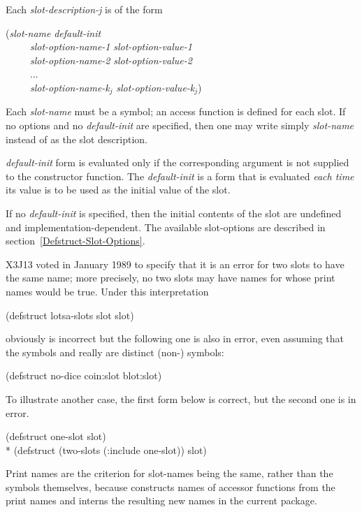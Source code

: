 \begin{defmac}
Each \emph{slot-description-j} is of the form
\begin{lisp}
(\emph{slot-name} \emph{default-init} \\
~~~~~\emph{slot-option-name-1} \emph{slot-option-value-1} \\
~~~~~\emph{slot-option-name-2} \emph{slot-option-value-2} \\
~~~~~... \\
~~~~~\emph{slot-option-name-k${}_{j}$} \emph{slot-option-value-k${}_{j}$})
\end{lisp}
Each \emph{slot-name} must be a symbol; an access function is defined
for each slot. If no options and no \emph{default-init} are specified,
then one may write simply \emph{slot-name} instead of 
as the slot description.

\emph{default-init} form is evaluated only if the corresponding
argument is not supplied to the constructor function. 
The \emph{default-init} is a form that is
evaluated \emph{each time} its value
is to be used as the initial value of the slot.

If no \emph{default-init}
is specified, then the initial contents of the slot are undefined
and implementation-dependent.  The available slot-options are
described in section~\ref{Defstruct-Slot-Options}.

\begin{new}
X3J13 voted in January 1989
to specify that it is an error for
two slots to have the same name; more precisely, no two slots may
have names for whose print names  would be true.
Under this interpretation
\begin{lisp}
(defstruct lotsa-slots slot slot)
\end{lisp}
obviously is incorrect
but the following one is also in error, even assuming that the symbols
 and  really are distinct (non-) symbols:
\begin{lisp}
(defstruct no-dice coin:slot blot:slot)
\end{lisp}
To illustrate another case, the first  form below is
correct, but the second one is in error.
\begin{lisp}
(defstruct one-slot slot) \\*
(defstruct (two-slots (:include one-slot)) slot)
\end{lisp}

\beforenoterule
\begin{rationale}
Print names are the criterion for slot-names being the same, rather
than the symbols themselves, because  constructs names
of accessor functions from the print names and interns the resulting
new names in the current package.
\end{rationale}
\afternoterule


\end{new}
\end{defmac}
